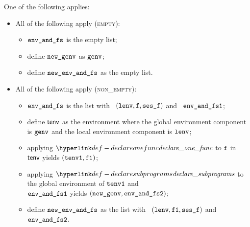 \ProseParagraph
One of the following applies:
\begin{itemize}
  \item All of the following apply (\textsc{empty}):
  \begin{itemize}
    \item $\texttt{env\_and\_fs}$ is the empty list;
    \item define $\texttt{new\_genv}$ as $\texttt{genv}$;
    \item define $\texttt{new\_env\_and\_fs}$ as the empty list.
  \end{itemize}

  \item All of the following apply (\textsc{non\_empty}):
  \begin{itemize}
    \item $\texttt{env\_and\_fs}$ is the list with \head\ $(\texttt{lenv}, \texttt{f}, \texttt{ses\_f})$ and \tail\ $\texttt{env\_and\_fs1}$;
    \item define $\textsf{tenv}$ as the environment where the global environment component is $\texttt{genv}$ and the local environment component is $\texttt{lenv}$;
    \item applying $\declareonefunc$ to $\texttt{f}$ in $\textsf{tenv}$ yields $(\texttt{tenv1}, \texttt{f1})$\ProseOrTypeError;
    \item applying $\declaresubprograms$ to the global environment of $\texttt{tenv1}$ and \\
          $\texttt{env\_and\_fs1}$ yields $(\texttt{new\_genv}, \texttt{env\_and\_fs2})$\ProseOrTypeError;
    \item define $\texttt{new\_env\_and\_fs}$ as the list with \head\ $(\texttt{lenv}, \texttt{f1}, \texttt{ses\_f})$ and \tail\ $\texttt{env\_and\_fs2}$.
  \end{itemize}
\end{itemize}

\FormallyParagraph
{}

